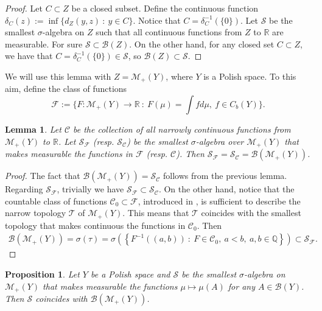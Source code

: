\documentclass[10pt,leqno]{amsart}
\numberwithin{equation}{section}
\newtheorem{prop}[teorema]{Proposition}
\newtheorem{lemma}[teorema]{Lemma}
\newcommand{\R}{\mathbb{R}}
\begin{document}
\begin{proof}
    Let $C\subset Z$ be a closed subset. Define the continuous function $\delta_C(z):= \inf\{d_Z(y,z) \ : \ y \in C\}$. Notice that $C = \delta_C^{-1}(\{0\}).$ Let $\mathcal{S}$ be the smallest $\sigma$-algebra on $Z$ such that all continuous functions from $Z$ to $\R$ are measurable. For sure $\mathcal{S}\subset \mathcal{B}(Z)$. On the other hand, for any closed set $C\subset Z$, we have that $C = \delta_C^{-1}(\{0\}) \in \mathcal{S}$, so $\mathcal{B}(Z)\subset \mathcal{S}$.
\end{proof}

We will use this lemma with $Z=\mathcal{M}_+(Y)$, where $Y$ is a Polish space. To this aim, define the class of functions 
\[\mathcal{F}:=\{F :\mathcal{M}_+(Y) \to \R \ : \ F(\mu) = \int f d\mu, \ f\in C_b(Y)\}.\]


\begin{lemma}
    Let $\mathcal{C}$ be the collection of all narrowly continuous functions from $\mathcal{M}_+(Y)$ to $\R$.
    Let $\mathcal{S}_\mathcal{F}$ (resp. $\mathcal{S}_\mathcal{C}$) be the smallest $\sigma$-algebra over $\mathcal{M}_+(Y)$ that makes measurable the functions in $\mathcal{F}$ (resp. $\mathcal{C}$).
    Then $\mathcal{S}_\mathcal{F} = \mathcal{S}_\mathcal{C}=\mathcal{B}(\mathcal{M}_+(Y)) $.
\end{lemma}

 \begin{proof}
    The fact that $\mathcal{B}(\mathcal{M}_+(Y)) = \mathcal{S}_\mathcal{C}$ follows from the previous lemma.
     Regarding $\mathcal
     S_\mathcal{F}$, trivially we have $\mathcal{S}_\mathcal{F} \subset \mathcal{S}_\mathcal{C}$. On the other hand, notice that the countable class of functions $\mathcal{C}_0\subset \mathcal{F}$, introduced in \cite[Remeark 5.1.1]{ambrosio2005gradient}, is sufficient to describe the narrow topology $\mathcal{T}$ of $\mathcal{M}_+(Y)$. This means that $\mathcal{T}$ coincides with the smallest topology that makes continuous the functions in $\mathcal{C}_0$. Then 
    \begin{align*}
        \mathcal{B}(\mathcal{M}_+(Y)) = \sigma(\tau) = \sigma\left( \left\{ 
        F^{-1}((a,b)) \ : \ F\in \mathcal{C}_0, \ a<b, \ a,b\in \mathbb{Q} \right\} \right) \subset \mathcal{S}_\mathcal{F}.
    \end{align*}
 \end{proof}   


\begin{prop}\label{equiv of sigma alg prop}
    Let $Y$ be a Polish space and $\mathcal{S}$ be the smallest $\sigma$-algebra on $\mathcal{M}_+(Y)$ that makes measurable the functions $\mu\mapsto \mu(A)$ for any $A\in \mathcal{B}(Y)$. Then $\mathcal{S}$ coincides with $\mathcal{B}(\mathcal{M}_+(Y))$.
\end{prop}
\end{document}
